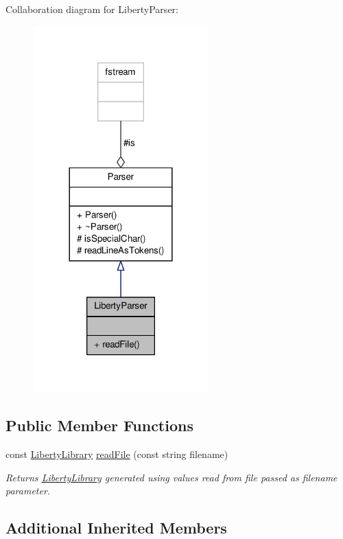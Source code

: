 Collaboration diagram for Liberty\-Parser\-:\nopagebreak
\begin{figure}[H]
\begin{center}
\leavevmode
\includegraphics[width=192pt]{classLibertyParser__coll__graph}
\end{center}
\end{figure}
\subsection*{Public Member Functions}
\begin{DoxyCompactItemize}
\item 
const \hyperlink{classLibertyLibrary}{Liberty\-Library} \hyperlink{classLibertyParser_a474451e29a86949f6ebef6948363874d}{read\-File} (const string filename)
\begin{DoxyCompactList}\small\item\em Returns \hyperlink{classLibertyLibrary}{Liberty\-Library} generated using values read from file passed as filename parameter. \end{DoxyCompactList}\end{DoxyCompactItemize}
\subsection*{Additional Inherited Members}



